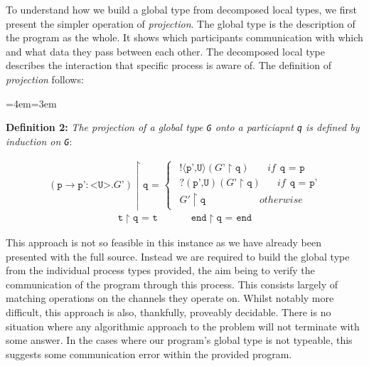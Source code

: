 \documentclass[11pt, abstracton, twoside, titlepage=true]{scrartcl}
\newenvironment{blockquote}{
	\par
	\medskip
	\leftskip=4em\rightskip=3em
	\noindent\ignorespaces
}{
	\par\medskip
}
\begin{document}
To understand how we build a global type from decomposed local types, we first 
present the simpler operation of \emph{projection}. The global type is the
description of the program as the whole. It shows which participants 
communication with which and what data they pass between each other. The decomposed
local type describes the interaction that specific process is aware of. The 
definition of \emph{projection} follows:

\begin{blockquote}
  \textbf{Definition 2:} \emph{The projection of a global type \texttt{G} onto 
  a particiapnt \texttt{q} is defined by induction on \texttt{G}}:
\end{blockquote}
\begin{align*}
  (\texttt{p} \rightarrow \texttt{p'}:\texttt{<U>}.\texttt{$G$'}) \upharpoonright \texttt{q = }  
  \begin{cases}
\hspace{5pt} !\langle \texttt{p',U} \rangle (\texttt{$G$'}\upharpoonright \texttt{q}) \hspace{22pt}if \hspace{5pt} \texttt{q = p} \\
\hspace{5pt} ?(\texttt{p',U}) (\texttt{$G$'}\upharpoonright \texttt{q}) \hspace{20pt}if \hspace{5pt} \texttt{q = p'} \\
\hspace{5pt} \texttt{$G'$}\upharpoonright \texttt{q} \hspace{65pt} otherwise
  \end{cases}
\end{align*}
\begin{align*}
  \texttt{t} \upharpoonright \texttt{q = t} 
  \hspace{40pt} \texttt{end} \upharpoonright \texttt{q = end}
\end{align*}

This approach is not so feasible in this instance as we have already been 
presented with the full source. Instead we are required to build the global
type from the individual process types provided, the aim being to verify
the communication of the program through this process. This consists largely of 
matching operations on the channels they operate on. Whilst notably more
difficult, this approach is also, thankfully, proveably decidable. There is
no situation where any algorithmic approach to the problem will not terminate
with some answer. In the cases where our program's global type is not
typeable, this suggests some communication error within the provided program.
\end{document}
